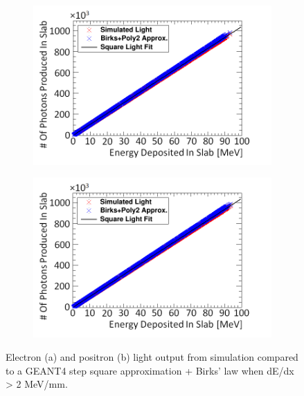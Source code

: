 \begin{figure}[!h]
\centering
\begin{subfigure}{.5\textwidth}
  \centering
  \includegraphics[width=\linewidth]{Chapter4/Figs/Raster/electronSimulatedLightBirksAndPoly2New.png}
  \captionsetup{width=.9\linewidth}
  \caption{}
  \label{subFig:square_electron_light}
\end{subfigure}%
\begin{subfigure}{.5\textwidth}
  \centering
  \includegraphics[width=\linewidth]{Chapter4/Figs/Raster/positronSimulatedLightBirksAndPoly2New.png}
  \captionsetup{width=.9\linewidth}
  \caption{}
  \label{subFig:square_positron_light}
\end{subfigure}
\caption{Electron (a) and positron (b) light output from simulation compared to a GEANT4 step square approximation + Birks' law when dE/dx > 2 MeV/mm.}
\label{fig:square_electron_positron_light}
\end{figure}

